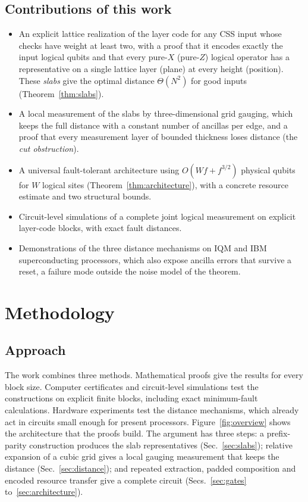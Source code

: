 \documentclass[10pt,a4paper,twocolumn]{article}
\begin{document}
\subsection{Contributions of this work}
\begin{itemize}
\item An explicit lattice realization of the layer code for any CSS input whose
checks have weight at least two, with a proof that it encodes exactly the input
logical qubits and that every pure-$X$ (pure-$Z$) logical operator has a
representative on a single lattice layer (plane) at every height (position).
These \emph{slabs} give the optimal distance $\Theta(N^2)$ for good inputs
(Theorem~\ref{thm:slabs}).
\item A local measurement of the slabs by three-dimensional grid gauging, which
keeps the full distance with a constant number of ancillas per edge, and a proof
that every measurement layer of bounded thickness loses distance (the
\emph{cut obstruction}).
\item A universal fault-tolerant architecture using $O(Wf+f^{3/2})$ physical
qubits for $W$ logical sites (Theorem~\ref{thm:architecture}), with a concrete
resource estimate and two structural bounds.
\item Circuit-level simulations of a complete joint logical measurement on
explicit layer-code blocks, with exact fault distances.
\item Demonstrations of the three distance mechanisms on IQM and IBM
superconducting processors, which also expose ancilla errors that survive a
reset, a failure mode outside the noise model of the theorem.
\end{itemize}

\section{Methodology}
\label{sec:methods}
\subsection{Approach}
The work combines three methods.  Mathematical proofs give the results for every
block size.  Computer certificates and circuit-level simulations test the
constructions on explicit finite blocks, including exact minimum-fault
calculations.  Hardware experiments test the distance mechanisms, which already
act in circuits small enough for present processors.
Figure~\ref{fig:overview} shows the architecture that the proofs build.  The
argument has three steps: a prefix-parity construction produces the slab
representatives (Sec.~\ref{sec:slabs}); relative expansion of a cubic grid
gives a local gauging measurement that keeps the distance
(Sec.~\ref{sec:distance}); and repeated extraction, padded composition and
encoded resource transfer give a complete circuit
(Secs.~\ref{sec:gates} to~\ref{sec:architecture}).
\end{document}
